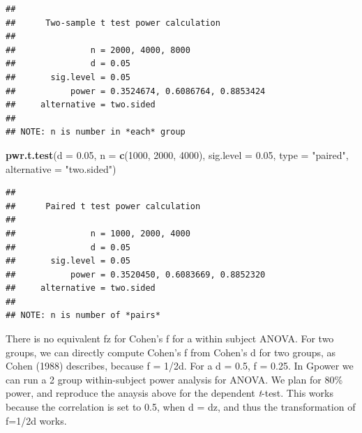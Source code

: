 \documentclass[]{article}
\newenvironment{Shaded}{\begin{snugshade}}{\end{snugshade}}
\newcommand{\KeywordTok}[1]{\textcolor[rgb]{0.13,0.29,0.53}{\textbf{#1}}}
\newcommand{\DataTypeTok}[1]{\textcolor[rgb]{0.13,0.29,0.53}{#1}}
\newcommand{\DecValTok}[1]{\textcolor[rgb]{0.00,0.00,0.81}{#1}}
\newcommand{\FloatTok}[1]{\textcolor[rgb]{0.00,0.00,0.81}{#1}}
\newcommand{\StringTok}[1]{\textcolor[rgb]{0.31,0.60,0.02}{#1}}
\newcommand{\NormalTok}[1]{#1}
\begin{document}
\begin{verbatim}
## 
##      Two-sample t test power calculation 
## 
##               n = 2000, 4000, 8000
##               d = 0.05
##       sig.level = 0.05
##           power = 0.3524674, 0.6086764, 0.8853424
##     alternative = two.sided
## 
## NOTE: n is number in *each* group
\end{verbatim}

\begin{Shaded}
\begin{Highlighting}[]
\KeywordTok{pwr.t.test}\NormalTok{(}\DataTypeTok{d =} \FloatTok{0.05}\NormalTok{,}
           \DataTypeTok{n =} \KeywordTok{c}\NormalTok{(}\DecValTok{1000}\NormalTok{, }\DecValTok{2000}\NormalTok{, }\DecValTok{4000}\NormalTok{),}
           \DataTypeTok{sig.level =} \FloatTok{0.05}\NormalTok{,}
           \DataTypeTok{type =} \StringTok{"paired"}\NormalTok{,}
           \DataTypeTok{alternative =} \StringTok{"two.sided"}\NormalTok{)}
\end{Highlighting}
\end{Shaded}

\begin{verbatim}
## 
##      Paired t test power calculation 
## 
##               n = 1000, 2000, 4000
##               d = 0.05
##       sig.level = 0.05
##           power = 0.3520450, 0.6083669, 0.8852320
##     alternative = two.sided
## 
## NOTE: n is number of *pairs*
\end{verbatim}

There is no equivalent fz for Cohen's f for a within subject ANOVA. For
two groups, we can directly compute Cohen's f from Cohen's d for two
groups, as Cohen (1988) describes, because f = 1/2d. For a d = 0.5, f =
0.25. In Gpower we can run a 2 group within-subject power analysis for
ANOVA. We plan for 80\% power, and reproduce the anaysis above for the
dependent \emph{t}-test. This works because the correlation is set to
0.5, when d = dz, and thus the transformation of f=1/2d works.
\end{document}
